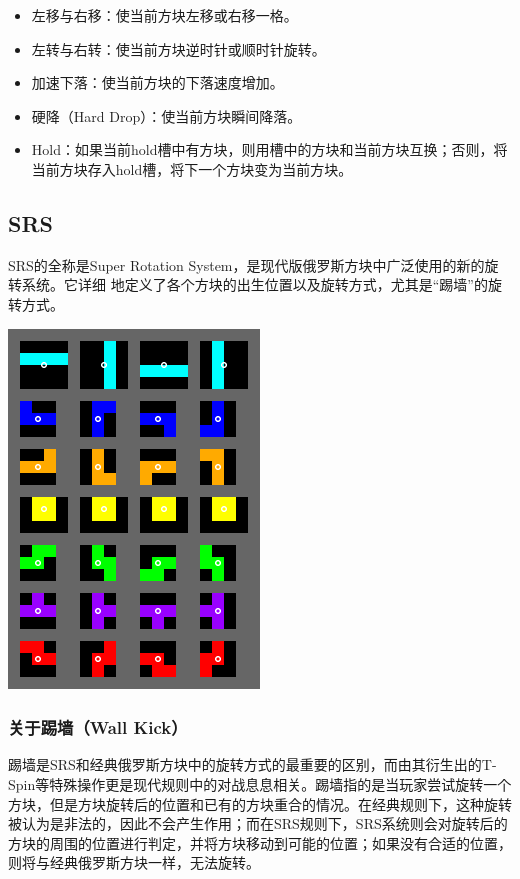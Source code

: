 \documentclass[10pt,UTF8]{article}
\newenvironment{Figure}
  {\par\medskip\noindent\minipage{\linewidth}}
  {\endminipage\par\medskip}
\begin{document}
\begin{multicols}{2}
\begin{itemize}
    \itemsep-5pt
    \item 左移与右移：使当前方块左移或右移一格。
    \item 左转与右转：使当前方块逆时针或顺时针旋转。
    \item 加速下落：使当前方块的下落速度增加。
    \item 硬降（Hard Drop）：使当前方块瞬间降落。
    \item Hold：如果当前hold槽中有方块，则用槽中的方块和当前方块互换；否则，将当前方块存入hold槽，将下一个方块变为当前方块。
\end{itemize}

\subsection{SRS}

SRS的全称是Super Rotation System，是现代版俄罗斯方块中广泛使用的新的旋转系统。它详细
地定义了各个方块的出生位置以及旋转方式，尤其是“踢墙”的旋转方式。

\begin{Figure}
    \centering
    \includegraphics[width=0.5\textwidth]{figure/SRS.png}
\end{Figure}


\subsubsection{关于踢墙（Wall Kick）}

踢墙是SRS和经典俄罗斯方块中的旋转方式的最重要的区别，而由其衍生出的T-Spin等特殊操作更是现代规则中的对战息息相关。踢墙指的是当玩家尝试旋转一个方块，但是方块旋转后的位置和已有的方块重合的情况。在经典规则下，这种旋转被认为是非法的，因此不会产生作用；而在SRS规则下，SRS系统则会对旋转后的方块的周围的位置进行判定，并将方块移动到可能的位置；如果没有合适的位置，则将与经典俄罗斯方块一样，无法旋转。


\end{multicols}
\end{document}
